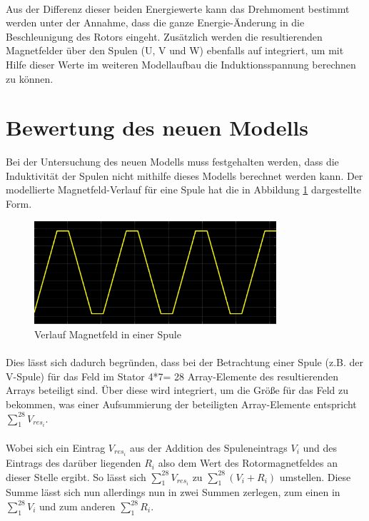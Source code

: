 \paragraph{}
Aus der Differenz dieser beiden Energiewerte kann das Drehmoment bestimmt werden unter der Annahme, dass die ganze Energie-Änderung in die Beschleunigung des Rotors eingeht.
Zusätzlich werden die resultierenden Magnetfelder über den Spulen (U, V und W) ebenfalls auf integriert, um mit Hilfe dieser Werte im weiteren Modellaufbau die Induktionsspannung berechnen zu können.

\section{Bewertung des neuen Modells}
Bei der Untersuchung des neuen Modells muss festgehalten werden, dass die Induktivität der Spulen nicht mithilfe dieses Modells berechnet werden kann. 
Der modellierte Magnetfeld-Verlauf für eine Spule hat die in Abbildung \ref{FigResultierendesFeld}
dargestellte Form.

\begin{figure}[htbp]
	\centering
	\includegraphics[width=0.8\textwidth]{./sim/pictures/resultierendesFeld.png}
	\caption{Verlauf Magnetfeld in einer Spule}
	\label{FigResultierendesFeld}
\end{figure}

\paragraph{}
Dies lässt sich dadurch begründen, dass bei der Betrachtung einer Spule (z.B. der V-Spule) für das Feld im Stator 4*7= 28 Array-Elemente des resultierenden Arrays beteiligt sind. Über diese wird integriert, um die Größe für das Feld zu bekommen, was einer Aufsummierung der beteiligten Array-Elemente entspricht $\sum \limits_1^{28} V_{res_i}$. 

\paragraph{}
Wobei sich ein Eintrag $V_{res_i}$ aus der Addition des Spuleneintrags $V_i$ und des Eintrags des darüber liegenden $R_i$ also dem Wert des Rotormagnetfeldes an dieser Stelle ergibt. So lässt sich $\sum \limits_1^{28} V_{res_i}$ zu $\sum \limits_1^{28} (V_i+R_i)$ umstellen. Diese Summe lässt sich nun allerdings nun in zwei Summen zerlegen, zum einen in $\sum \limits_1^{28} V_i$ und zum anderen $\sum \limits_1^{28} R_i$. 

